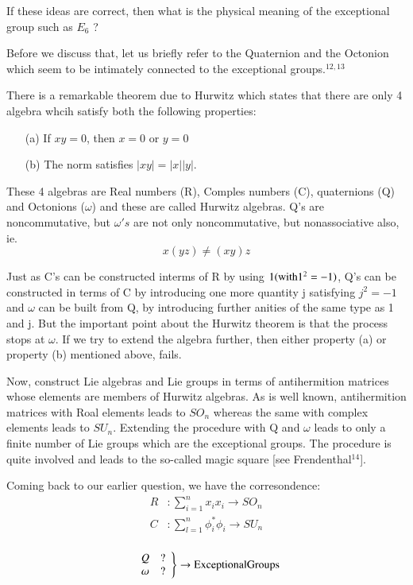 If these ideas are correct, then what is the physical meaning of the exceptional group such as $E_{6}$ ?

Before we discuss that, let us briefly refer to the Quaternion and the Octonion which seem to be intimately connected to the exceptional groups.$^{12, 13}$

There is a remarkable theorem due to Hurwitz which states that there are only 4 algebra whcih satisfy both the following properties:
\begin{itemize}
\item[(a)] If $xy=0$, then $x=0$ or $y=0$
\item[(b)] The norm satisfies $|xy|=|x| |y|$. 
\end{itemize}

These 4 algebras are Real numbers (R), Comples numbers (C), quaternions (Q) and Octonions ($\omega$) and these are called Hurwitz algebras. Q's are noncommutative, but $\omega's$ are not only noncommutative, but nonassociative also, ie.
$$
x(yz) \neq (xy)z
$$

Just as C's can be constructed interms of R by using $1({\rm with} 1^{2}=-1)$, Q's can be constructed in terms of C by introducing one more quantity j satisfying $j^{2}=-1$ and $\omega$ can be built from Q, by introducing further anities of the same type as 1 and j. But the important point about the Hurwitz theorem is that the process stops at $\omega$. If we try to extend the algebra further, then either property (a) or property (b) mentioned above, fails.

Now, construct Lie algebras and Lie groups in terms of antihermition matrices whose elements are members of Hurwitz algebras. As is well known, antihermition matrices with Roal elements leads to $SO_{n}$ whereas the same with complex elements leads to $SU_{n}$. Extending the procedure with Q and $\omega$ leads to only a finite number of Lie groups which are the exceptional groups. The procedure is quite involved and leads to the so-called magic square [see Frendenthal$^{14}$].

Coming back to our earlier question, we have the corresondence:
\begin{align*}
R &: \sum_{i=1}^{n} x_{i} x_{i} \rightarrow SO_{n}\\
C &: \sum_{l=1}^{n} \phi_{i}^{*} \phi_{i} \rightarrow SU_{n}\\
\end{align*}
 
 \begin{equation*}
   \left.
   \begin{array}{cc}
     Q & ?  \\
     \omega & ?
   \end{array}
   \right\} \rightarrow {\rm Exceptional Groups}
\end{equation*}

